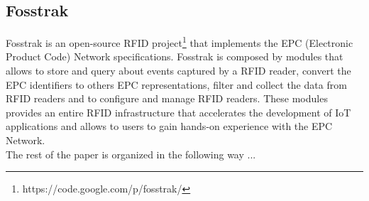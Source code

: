 \subsection{Fosstrak}
\label{sub:fosstrak}
Fosstrak is an open-source RFID project\footnote{https://code.google.com/p/fosstrak/} that implements the EPC (Electronic Product Code) Network specifications. Fosstrak is composed by modules that allows to store and query about events captured
by a RFID reader, convert the EPC identifiers to others EPC representations, filter and collect the data from RFID readers and to configure and manage RFID readers. These modules provides an entire RFID infrastructure that accelerates the
development of IoT applications and allows to users to gain hands-on experience with the EPC Network.\\

The rest of the paper is organized in the following way ...
